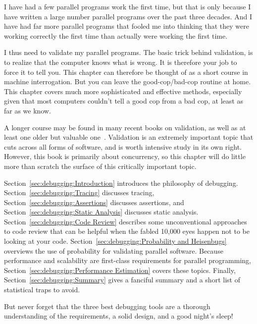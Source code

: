 
%

I have had a few parallel programs work the first time, but that is only
because I have written a large number parallel programs over the past three
decades.
And I have had far more parallel programs that fooled me into thinking
that they were working correctly the first time than actually were working
the first time.

I thus need to validate my parallel programs.
The basic trick behind validation, is to realize that the computer knows
what is wrong.
It is therefore your job to force it to tell you.
This chapter can therefore be thought of as a short course in
machine interrogation.
But you can leave the good-cop/bad-cop routine at home.
This chapter covers much more sophisticated and effective methods,
especially given that most computers couldn't tell a good cop from a
bad cop, at least as far as we know.

A longer course may be found in many recent books on validation, as
well as at least one older but valuable
one~\cite{GlenfordJMyers1979}.
Validation is an extremely important topic that cuts across all forms
of software, and is worth intensive study in its own right.
However, this book is primarily about concurrency, so this chapter will do
little more than scratch the surface of this critically important topic.

Section~\ref{sec:debugging:Introduction}
introduces the philosophy of debugging.
Section~\ref{sec:debugging:Tracing}
discusses tracing,
Section~\ref{sec:debugging:Assertions}
discusses assertions, and
Section~\ref{sec:debugging:Static Analysis}
discusses static analysis.
Section~\ref{sec:debugging:Code Review}
describes some unconventional approaches to code review that can
be helpful when the fabled 10,000 eyes happen not to be looking at your code.
Section~\ref{sec:debugging:Probability and Heisenbugs}
overviews the use of probability for validating parallel software.
Because performance and scalability are first-class requirements
for parallel programming,
Section~\ref{sec:debugging:Performance Estimation} covers these
topics.
Finally,
Section~\ref{sec:debugging:Summary}
gives a fanciful summary and a short list of statistical traps to avoid.

But never forget that the three best debugging tools are a thorough
understanding of the requirements, a solid design, and a good night's
sleep!

